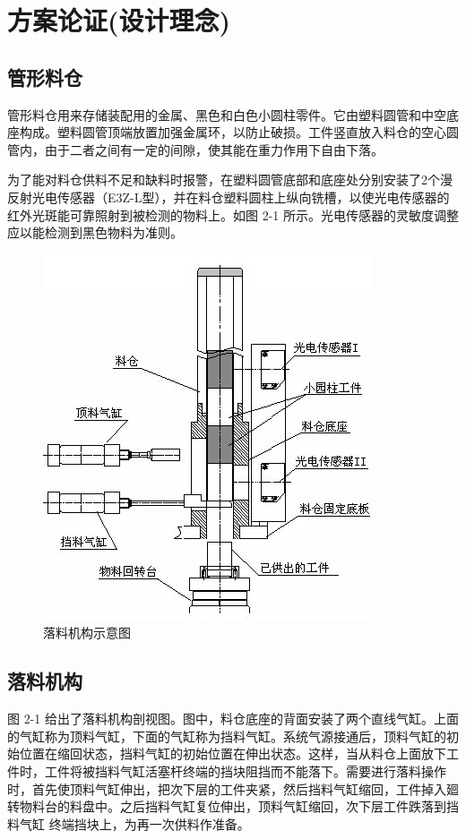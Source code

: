 \documentclass[12pt]{article}
\begin{document}
\section{方案论证(设计理念)}
\subsection{管形料仓}
管形料仓用来存储装配用的金属、黑色和白色小圆柱零件。它由塑料圆管和中空底座构成。塑料圆管顶端放置加强金属环，以防止破损。工件竖直放入料仓的空心圆管内，由于二者之间有一定的间隙，使其能在重力作用下自由下落。 

为了能对料仓供料不足和缺料时报警，在塑料圆管底部和底座处分别安装了2个漫反射光电传感器（E3Z-L型），并在料仓塑料圆柱上纵向铣槽，以使光电传感器的红外光斑能可靠照射到被检测的物料上。如图 2-1 所示。光电传感器的灵敏度调整应以能检测到黑色物料为准则。
\begin{figure}[htbp]
    \centering
    \includegraphics[scale=0.8]{fig/2-1.jpg}
    \caption{落料机构示意图}
\end{figure} 

\subsection{落料机构}
图 2-1 给出了落料机构剖视图。图中，料仓底座的背面安装了两个直线气缸。上面的气缸称为顶料气缸，下面的气缸称为挡料气缸。系统气源接通后，顶料气缸的初始位置在缩回状态，挡料气缸的初始位置在伸出状态。这样，当从料仓上面放下工件时，工件将被挡料气缸活塞杆终端的挡块阻挡而不能落下。需要进行落料操作时，首先使顶料气缸伸出，把次下层的工件夹紧，然后挡料气缸缩回，工件掉入廻转物料台的料盘中。之后挡料气缸复位伸出，顶料气缸缩回，次下层工件跌落到挡料气缸
终端挡块上，为再一次供料作准备。
\end{document}
